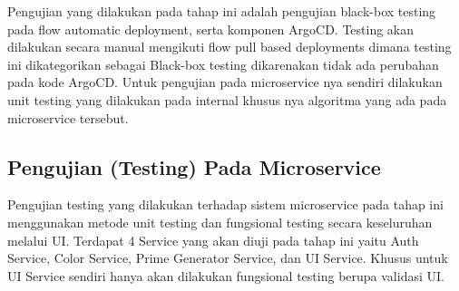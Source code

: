 Pengujian yang dilakukan pada tahap ini adalah pengujian black-box testing pada
flow automatic deployment, serta komponen ArgoCD. Testing akan dilakukan secara
manual mengikuti flow pull based deployments dimana testing ini dikategorikan
sebagai Black-box testing dikarenakan tidak ada perubahan pada kode ArgoCD.
Untuk pengujian pada microservice nya sendiri dilakukan unit testing yang
dilakukan pada internal khusus nya algoritma yang ada pada microservice
tersebut.

\subsection{Pengujian (Testing) Pada Microservice}\label{subsec:bab4_pengujian_microservice}
Pengujian testing yang dilakukan terhadap sistem microservice pada tahap ini
menggunakan metode unit testing dan fungsional testing secara keseluruhan
melalui UI. Terdapat 4 Service yang akan diuji pada tahap ini yaitu Auth
Service, Color Service, Prime Generator Service, dan UI Service. Khusus untuk
UI Service sendiri hanya akan dilakukan fungsional testing berupa validasi UI.
